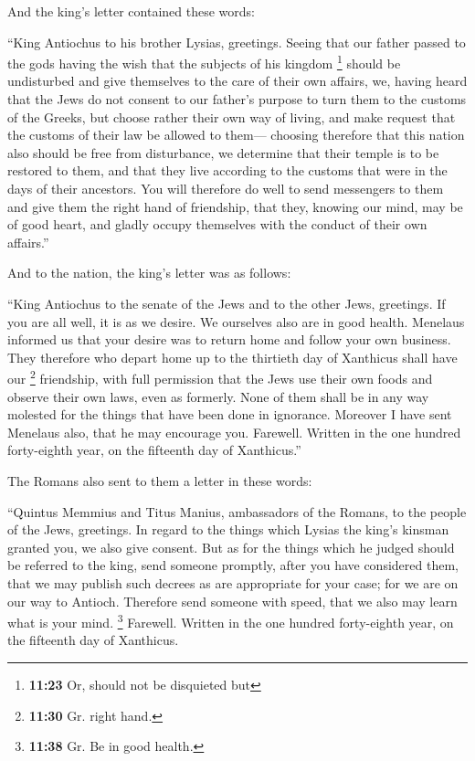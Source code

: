  And the king's letter contained these words:

``King Antiochus to his brother Lysias, greetings. 
Seeing that our father passed to the gods having the wish that the
subjects of his kingdom \footnote{\textbf{11:23} Or, should not be
  disquieted but} should be undisturbed and give themselves to the care
of their own affairs,  we, having heard that the Jews do
not consent to our father's purpose to turn them to the customs of the
Greeks, but choose rather their own way of living, and make request that
the customs of their law be allowed to them---  choosing
therefore that this nation also should be free from disturbance, we
determine that their temple is to be restored to them, and that they
live according to the customs that were in the days of their ancestors.
 You will therefore do well to send messengers to them
and give them the right hand of friendship, that they, knowing our mind,
may be of good heart, and gladly occupy themselves with the conduct of
their own affairs.''

 And to the nation, the king's letter was as follows:

``King Antiochus to the senate of the Jews and to the other Jews,
greetings.  If you are all well, it is as we desire. We
ourselves also are in good health.  Menelaus informed us
that your desire was to return home and follow your own business.
 They therefore who depart home up to the thirtieth day
of Xanthicus shall have our \footnote{\textbf{11:30} Gr. right hand.}
friendship, with full permission  that the Jews use their
own foods and observe their own laws, even as formerly. None of them
shall be in any way molested for the things that have been done in
ignorance.  Moreover I have sent Menelaus also, that he
may encourage you.  Farewell. Written in the one hundred
forty-eighth year, on the fifteenth day of Xanthicus.''

 The Romans also sent to them a letter in these words:

``Quintus Memmius and Titus Manius, ambassadors of the Romans, to the
people of the Jews, greetings.  In regard to the things
which Lysias the king's kinsman granted you, we also give consent.
 But as for the things which he judged should be referred
to the king, send someone promptly, after you have considered them, that
we may publish such decrees as are appropriate for your case; for we are
on our way to Antioch.  Therefore send someone with
speed, that we also may learn what is your mind. 
\footnote{\textbf{11:38} Gr. Be in good health.} Farewell. Written in
the one hundred forty-eighth year, on the fifteenth day of Xanthicus.


